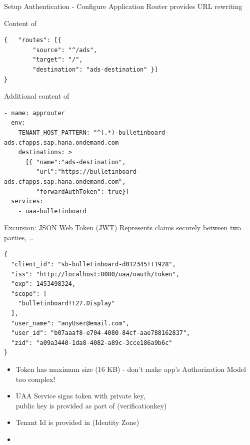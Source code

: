 \begin{frame}[fragile,t]{Setup Authentication - Configure Application Router}
 provides URL rewriting
\begin{block}{Content of }
\vspace{-3mm}
\scriptsize
\begin{lstlisting}[style=json]
{   "routes": [{
        "source": "^/ads",
        "target": "/",
        "destination": "ads-destination" }]
}
\end{lstlisting}
\vspace{-5mm}
\end{block}
\vfill
\begin{block}{Additional content of }
\vspace{-3mm}
\scriptsize
       \begin{verbatim}
- name: approuter
  env:
    TENANT_HOST_PATTERN: "^(.*)-bulletinboard-ads.cfapps.sap.hana.ondemand.com
    destinations: >
      [{ "name":"ads-destination", 
         "url":"https://bulletinboard-ads.cfapps.sap.hana.ondemand.com",
         "forwardAuthToken": true}]
  services:
    - uaa-bulletinboard
\end{verbatim}
\vspace{-5mm}
\end{block}
\end{frame}


\begin{frame}[fragile,t]{Excursion: JSON Web Token (JWT)}
Represents claims securely between two parties, \ldots
\scriptsize
\begin{lstlisting}[style=json]
{
  "client_id": "sb-bulletinboard-d012345!t1928",
  "iss": "http://localhost:8080/uaa/oauth/token",
  "exp": 1453498324,
  "scope": [
    "bulletinboard!t27.Display"
  ],
  "user_name": "anyUser@email.com",
  "user_id": "b07aaaf8-e704-4080-84cf-aae788162837",  
  "zid": "a09a3440-1da8-4082-a89c-3cce186a9b6c"
}
\end{lstlisting}
\vfill
\begin{itemize}
\item Token has maximum size (16 KB) -  don't make app's Authorization Model too complex!
\item UAA Service signs token with private key, \\public key is provided as part of  (verificationkey)
\item Tenant Id is provided in  (Identity Zone)
\item {}
\end{itemize}
\end{frame}



